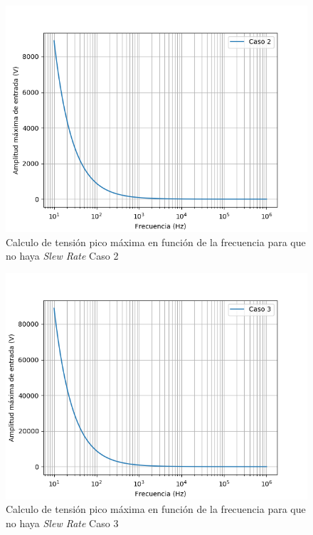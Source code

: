 \begin{figure}[H]
\begin{centering}
\includegraphics[scale=0.5]{../Ex1/iA/Resources1a/SlewRate2}
\par\end{centering}
\caption{Calculo de tensión pico máxima en función de la frecuencia para que
no haya \emph{Slew Rate} Caso 2}
\label{1_a_15}

\end{figure}

\begin{figure}[H]
\begin{centering}
\includegraphics[scale=0.5]{../Ex1/iA/Resources1a/SlewRate3}
\par\end{centering}
\caption{Calculo de tensión pico máxima en función de la frecuencia para que
no haya \emph{Slew Rate} Caso 3}
\label{1_a_16}

\end{figure}

